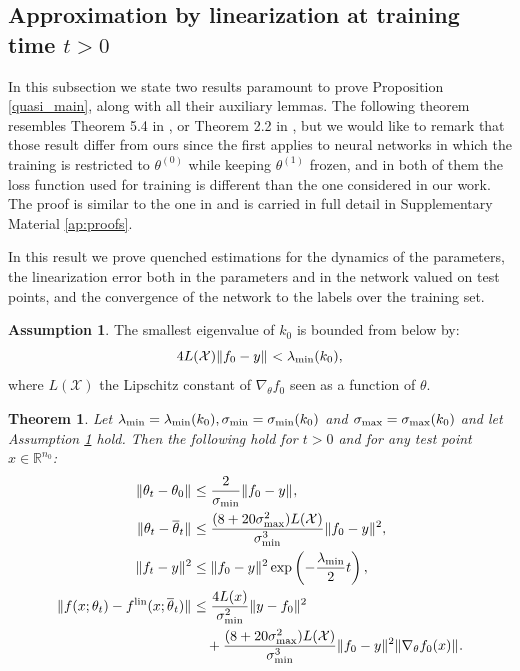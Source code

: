 \documentclass{article}
\newtheorem{thm}{Theorem}[section]
\theoremstyle{definition}
\newtheorem{ass}{Assumption}
\theoremstyle{remark}
\numberwithin{equation}{section}
\newcommand{\X}{\mathcal{X}}
\newcommand{\R}{\mathbb{R}}
\newcommand{\lin}{{\textup{lin}}}
\newcommand{\lammin}{\lambda_{\textup{min}}}
\newcommand{\sigmin}{\sigma_{\textup{min}}}
\newcommand{\sigmax}{\sigma_{\textup{max}}}
\newcommand{\norm}[2]{
    \|#1\|_{#2}
}
\begin{document}
\subsection{Approximation by linearization at training time $t>0$}

In this subsection we state two results paramount to prove Proposition \ref{quasi_main}, along with all their auxiliary lemmas.
The following theorem resembles Theorem 5.4 in \cite{Bartlett_Montanari_Rakhlin_2021}, or Theorem 2.2 in \cite{bachchizat},
but we would like to remark that those result differ from ours since the first applies to neural networks in which the training is restricted to $\theta^{(0)}$ while keeping $\theta^{(1)}$ frozen,
and in both of them the loss function used for training is different than the one considered in our work.
The proof is similar to the one in \cite{Bartlett_Montanari_Rakhlin_2021} and is carried in full detail in Supplementary Material \ref{ap:proofs}.

In this result we prove quenched estimations for the dynamics of the parameters, 
the linearization error both in the parameters and in the network valued on test points, 
and the convergence of the network to the labels over the training set.

\begin{ass}
    \label{assumption_montanari}
    The smallest eigenvalue of $k_0$ is bounded from below by:
    \[
        4 L(\X) \norm{f_0-y}{} < \lammin(k_0),
    \]
    where $L(\X)$ the Lipschitz constant of $\nabla_\theta f_0$ seen as a function of $\theta$.
\end{ass}
\begin{thm}
    \label{thm:montanari}
    Let $\lammin = \lammin(k_0), \sigmin = \sigmin(k_0)$ and $\sigmax = \sigmax(k_0)$
    and let Assumption \ref{assumption_montanari} hold.
    Then the following hold for $t>0$ and for any test point $x\in \R^{n_0}$:
    \begin{align}
        \norm{\theta_t-\theta_0}{} &\le \frac{2}{\sigmin}\norm{f_0-y}{}, \\
        \norm{\theta_t-\overline \theta_t}{} &\le \frac{(8+20\sigmax^2)L(\X)}{\sigmin^3} \norm{f_0-y}{}^2,\\
        \norm{f_t-y}{}^2 &\le \norm{f_0-y}{}^2 \exp\left(-\frac{\lammin}{2} t\right), \\
        \norm{f(x;\theta_t) - f^\lin(x;\overline \theta_t)}{} &\le \frac{4 L(x)}{\sigmin^2}\norm{y-f_0}{}^2 \\
        &\quad + \frac{(8+20\sigmax^2)L(\X)}{\sigmin^3} \norm{f_0-y}{}^2 \norm{\nabla_\theta f_0(x)}{}.
    \end{align}
\end{thm}
\end{document}
